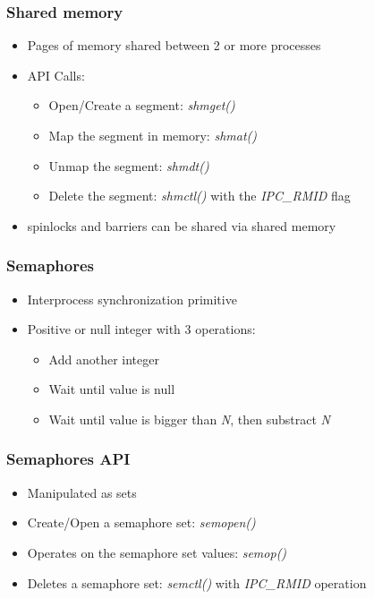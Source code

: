 \begin{frame}
  \frametitle{Shared memory}

  \begin{itemize}
  \item Pages of memory shared between 2 or more processes
  \item API Calls:
    \begin{itemize}
    \item Open/Create a segment: \emph{shmget()}
    \item Map the segment in memory: \emph{shmat()}
    \item Unmap the segment: \emph{shmdt()}
    \item Delete the segment: \emph{shmctl()} with the \emph{IPC\_RMID} flag
    \end{itemize}
  \item spinlocks and barriers can be shared via shared memory
  \end{itemize}
\end{frame}


\begin{frame}
  \frametitle{Semaphores}

  \begin{itemize}
  \item Interprocess synchronization primitive
  \item Positive or null integer with 3 operations:
    \begin{itemize}
    \item Add another integer
    \item Wait until value is null
    \item Wait until value is bigger than \emph{N}, then substract \emph{N}
    \end{itemize}
  \end{itemize}
\end{frame}

\begin{frame}
  \frametitle{Semaphores API}

  \begin{itemize}
  \item Manipulated as sets
  \item Create/Open a semaphore set: \emph{semopen()}
  \item Operates on the semaphore set values: \emph{semop()}
  \item Deletes a semaphore set: \emph{semctl()} with \emph{IPC\_RMID} operation
  \end{itemize}
\end{frame}


